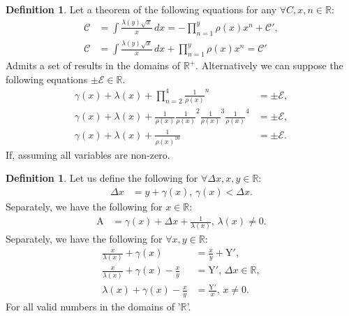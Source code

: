 \documentclass[10pt]{article}
\theoremstyle{plain}
\theoremstyle{definition}
\newtheorem{definition}[theorem]{Definition}
\theoremstyle{remark}
\begin{document}
\begin{definition}
	Let a theorem of the following equations for any $\forall C, x, n \in \mathbb{R}$:
	\begin{align*}
		\mathcal{C} &= \int \frac{\lambda(y) \sqrt{x}}{x} \, dx = - \prod_{n=1}^{y}\rho(x) x^{n} + \mathcal{C}',\\
		\mathcal{C} &= \int \frac{\lambda(y) \sqrt{x}}{x} \, dx + \prod_{n=1}^{y}\rho(x) x^{n} = \mathcal{C}'
	\end{align*}
	Admits a set of results in the domains of $\mathbb{R}^{+}$. Alternatively we can suppose the following equations $\pm \mathcal{E} \in \mathbb{R}.$
	\begin{align*}
		\gamma(x)+\lambda(x) + \prod_{n=2}^{4}\frac{1}{\rho(x)}^{n} &= \pm \mathrm{\mathcal{E}},\\
		\gamma(x)+\lambda(x) + \frac{1}{\rho(x)} \frac{1}{\rho(x)}^{2} \frac{1}{\rho(x)}^{3} \frac{1}{\rho(x)}^{4} &= \pm \mathrm{\mathcal{E}},\\
		\gamma(x)+\lambda(x) + \frac{1}{\rho(x)^{10}} &= \pm \mathrm{\mathcal{E}}.
	\end{align*}
	If, assuming all variables are non-zero.
\end{definition}

\begin{definition}
	Let us define the following for $\forall \Delta x, x, y \in \mathbb{R}$:
	\begin{align*}
	\Delta x &=	y + \gamma(x), \, \gamma(x) < \Delta x.
	\end{align*}
  	Separately, we have the following for $x \in \mathbb{R}$:
	\begin{align*}
		\mathrm{A} &= \gamma(x)+\Delta x + \frac{1}{\lambda(x)}, \, \lambda(x) \neq 0.
	\end{align*}
  Separately, we have the following  for $\forall x, y \in \mathbb{R}$:
	\begin{align*}
		\frac{x}{\lambda(x)} + \gamma(x) &= \frac{x}{y} + \mathrm{Y'},\\
		\frac{x}{\lambda(x)} + \gamma(x) - \frac{x}{y} &= \mathrm{Y'}, \, \Delta x \in \mathbb{R},\\
		\lambda(x) + \gamma(x) -\frac{x}{y} &= \frac{\mathrm{Y'}}{x}, \, x \neq 0.
	\end{align*}
	For all valid numbers in the domains of '$\mathbb{R}$'.
\end{definition}
\end{document}
